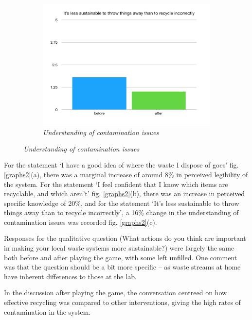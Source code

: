 \documentclass[nofonts,nols,justified,nobib]{tufte-book}
\begin{document}
\begin{figure}
  \centering
\begin{subfigure}{1\textwidth}
  \includegraphics[width=1\linewidth]{img/4/llk-contamination.png}
\caption{\textit{Understanding of contamination issues}}
\end{subfigure}
\end{figure}
\vspace{0.8cm}

For the statement `I have a good idea of where the waste I dispose of goes' fig. \ref{graphs2}(a), there was a marginal increase of around 8\% in perceived legibility of the system. For the statement `I feel confident that I know which items are recyclable, and which aren't' fig. \ref{graphs2}(b), there was an increase in perceived specific knowledge of 20\%, and for the statement `It's less sustainable to throw things away than to recycle incorrectly', a 16\% change in the understanding of contamination issues was recorded fig. \ref{graphs2}(c). 

Responses for the qualitative question (What actions do you think are important in making your local waste systems more sustainable?) were largely the same both before and after playing the game, with some left unfilled. One comment was that the question should be a bit more specific -- as waste streams at home have inherent differences to those at the lab.

In the discussion after playing the game, the conversation centreed on how effective recycling was compared to other interventions, giving the high rates of contamination in the system. 
\end{document}
